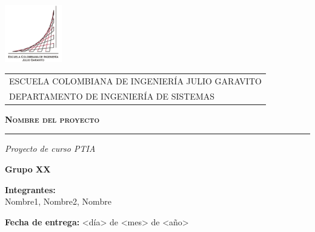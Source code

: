 \begin{titlepage}
\includegraphics[width=2.5cm]{img/logo_eci_h.png} %
\vspace*{-2.2cm} %


\begin{tabular}{l}
\hspace{2.5cm} ESCUELA COLOMBIANA DE INGENIERÍA JULIO GARAVITO\\
\hspace{2.5cm} DEPARTAMENTO DE INGENIERÍA DE SISTEMAS\\
\end{tabular}

\begin{center}
\vspace{3cm}
{\scshape\Huge \textbf{Nombre del proyecto} \par}
\rule{80mm}{0.1mm}

{\itshape\LARGE Proyecto de curso PTIA \par}
\vfill
{\Large \textbf{Grupo XX} \par}
\vspace{0.5cm}
{\large \textbf{Integrantes:}\\\normalsize Nombre1, Nombre2, Nombre \par} 


\medskip
\textbf{Fecha de entrega:} <día> de <mes> de <año>
\vspace{3cm}
\end{center}
\end{titlepage}
\newpage